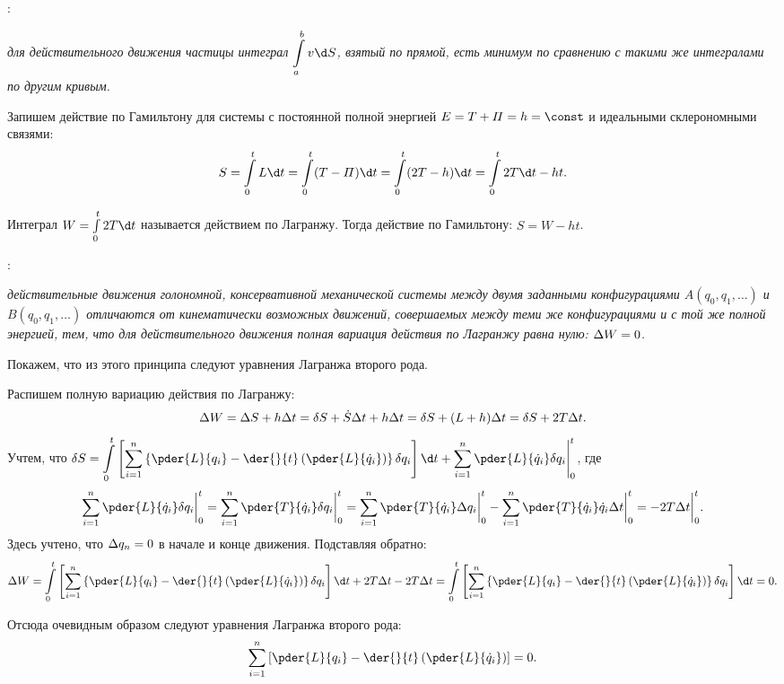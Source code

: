 
:

\emph{для действительного движения частицы интеграл
\( \ds \int\limits_a^b v\d S \), взятый по прямой, есть минимум по сравнению
с такими же интегралами по другим кривым.}

Запишем действие по Гамильтону для системы с постоянной полной энергией
\( E = T + \varPi = h = \const \) и идеальными склерономными связями:
\[
    S = \int\limits_0^t L\d t = \int\limits_0^t (T - \varPi)\d t =
    \int\limits_0^t (2T - h)\d t = \int\limits_0^t 2T\d t - ht.
\]

Интеграл \( W = \int\limits_0^t 2T\d t \) называется действием по Лагранжу.
Тогда действие по Гамильтону: \( S = W - ht \).

:

\emph{действительные движения голономной, консервативной механической системы
между двумя заданными конфигурациями \( A(q_0, q_1, \ldots) \) и \( B(q_0, q_1,
\ldots) \) отличаются от кинематически возможных движений, совершаемых между
теми же конфигурациями и с той же полной энергией, тем, что для действительного
движения полная вариация действия по Лагранжу равна нулю: \( \Delta W = 0 \).}

Покажем, что из этого принципа следуют уравнения Лагранжа второго рода.

Распишем полную вариацию действия по Лагранжу:
\[
    \Delta W = \Delta S + h\Delta t = \delta S + \dot{S}\Delta t + h\Delta t =
    \delta S + (L + h)\Delta t = \delta S + 2T\Delta t.
\]
Учтем, что \( \ds
    \delta S = \int\limits_0^t \left[\sum\limits_{i=1}^n \left\{\pder{L}{q_i} -
    \der{}{t}\left(\pder{L}{\dot{q}_i}\right)\right\}\delta q_i\right]\d t +
    \sum\limits_{i=1}^n \pder{L}{\dot{q}_i}\delta q_i\Biggr|_0^t \),
где
\[
    \sum\limits_{i=1}^n \pder{L}{\dot{q}_i}\delta q_i\biggr|_0^t =
    \sum\limits_{i=1}^n \pder{T}{\dot{q}_i}\delta q_i\biggr|_0^t =
    \sum\limits_{i=1}^n \pder{T}{\dot{q}_i}\D q_i\biggr|_0^t -
    \sum\limits_{i=1}^n \pder{T}{\dot{q}_i}\dot{q}_i\D t\biggr|_0^t =
    -2T\D t\biggr|_0^t.
\]
Здесь учтено, что \( \Delta q_n = 0 \) в начале и конце движения. Подставляя
обратно:
\[
    \D W = \int\limits_0^t \left[\sum\limits_{i=1}^n \left\{\pder{L}{q_i} -
    \der{}{t}\left(\pder{L}{\dot{q}_i}\right)\right\}\delta q_i\right]\d t +
    2T\D t - 2T\D t = \int\limits_0^t \left[\sum\limits_{i=1}^n \left\{
    \pder{L}{q_i} - \der{}{t}\left(\pder{L}{\dot{q}_i}\right)\right\}
    \delta q_i\right]\d t = 0.
\]

Отсюда очевидным образом следуют уравнения Лагранжа второго рода:
\[
    \sum\limits_{i=1}^n \left[\pder{L}{q_i} -
    \der{}{t}\left(\pder{L}{\dot{q}_i}\right)\right] = 0.
\]

\newpage
